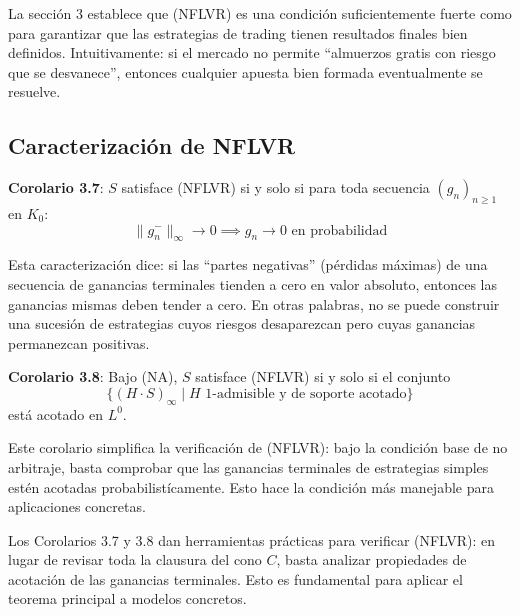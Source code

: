 \documentclass[12pt]{article}
\begin{document}
\begin{intuicion}
La secci\'on 3 establece que (NFLVR) es una condici\'on suficientemente fuerte como para garantizar que las estrategias de trading tienen resultados finales bien definidos. Intuitivamente: si el mercado no permite ``almuerzos gratis con riesgo que se desvanece'', entonces cualquier apuesta bien formada eventualmente se resuelve.
\end{intuicion}

\subsection{Caracterizaci\'on de NFLVR}

\textbf{Corolario 3.7}: $S$ satisface (NFLVR) si y solo si para toda secuencia $(g_n)_{n \geq 1}$ en $K_0$:
\begin{equation}
    \|g_n^-\|_\infty \to 0 \implies g_n \to 0 \text{ en probabilidad}
\end{equation}

\begin{intuicionmat}
Esta caracterizaci\'on dice: si las ``partes negativas'' (p\'erdidas m\'aximas) de una secuencia de ganancias terminales tienden a cero en valor absoluto, entonces las ganancias mismas deben tender a cero. En otras palabras, no se puede construir una sucesi\'on de estrategias cuyos riesgos desaparezcan pero cuyas ganancias permanezcan positivas.
\end{intuicionmat}

\textbf{Corolario 3.8}: Bajo (NA), $S$ satisface (NFLVR) si y solo si el conjunto
\begin{equation}
    \{(H \cdot S)_\infty \mid H \text{ 1-admisible y de soporte acotado}\}
\end{equation}
est\'a acotado en $L^0$.

\begin{intuicionmat}
Este corolario simplifica la verificaci\'on de (NFLVR): bajo la condici\'on base de no arbitraje, basta comprobar que las ganancias terminales de estrategias simples est\'en acotadas probabilist\'icamente. Esto hace la condici\'on m\'as manejable para aplicaciones concretas.
\end{intuicionmat}

\begin{intuicion}
Los Corolarios 3.7 y 3.8 dan herramientas pr\'acticas para verificar (NFLVR): en lugar de revisar toda la clausura del cono $C$, basta analizar propiedades de acotaci\'on de las ganancias terminales. Esto es fundamental para aplicar el teorema principal a modelos concretos.
\end{intuicion}
\end{document}
